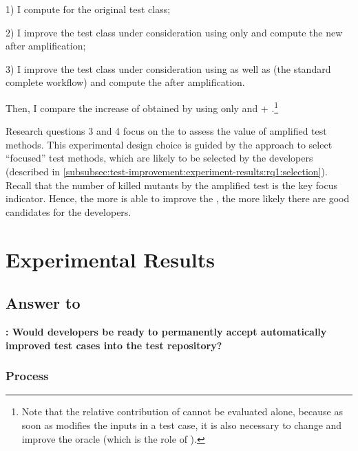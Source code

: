 \begin{itemize}
	1) I compute \ams for the original test class;
	
	2) I improve the test class under consideration using only \Aampl{} and compute the new \ams after amplification; 
	
	3) I improve the test class under consideration using \Iampl{} as well as \Aampl{} (the standard complete \dspot workflow) and compute the \ams after amplification. 
	
	Then, I compare the increase of \ms obtained by using \Aampl{} only and \Aampl{} + \Iampl{}.\footnote{Note that the relative contribution of \Iampl{} cannot be evaluated alone, because as soon as \dspot modifies the inputs in a test case, it is also necessary to change and improve the oracle (which is the role of \Aampl{}).}
\end{itemize}

Research questions 3 and 4 focus on the \ms to assess the value of amplified test methods.
This experimental design choice is guided by the approach to select ``focused'' test methods, which are likely to be selected by the developers (described in \autoref{subsubsec:test-improvement:experiment-results:rq1:selection}). 
Recall that the number of killed mutants by the amplified test is the key focus indicator. 
Hence, the more \dspot is able to improve the \ms, the more likely there are good candidates for the developers.

\section{Experimental Results}
\label{sec:test-improvement:experiment-results}


\subsection{Answer to \rqpullrequest}
\label{subsec:test-improvement:experiment-results:rq1}

\textbf{\rqpullrequest: Would developers be ready to permanently accept automatically improved test cases into the test repository?}

\subsubsection{Process}
\label{subsubsec:test-improvement:experiment-results:rq1:process}

